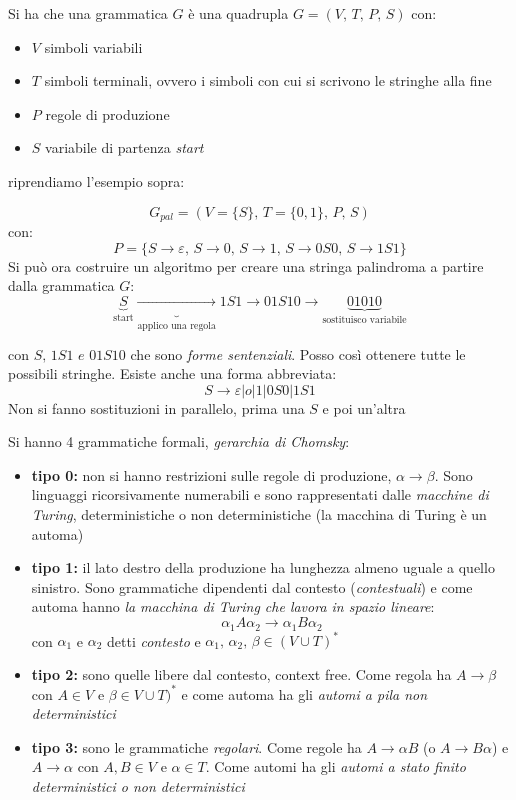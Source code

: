 \documentclass[a4paper,12pt, oneside]{book}
\begin{document}
Si ha che una grammatica $G$ è una quadrupla $G=(V,\,T,\,P,\,S)$ con:
\begin{itemize}
\item $V$ simboli variabili
\item $T$ simboli terminali, ovvero i simboli con cui si scrivono le stringhe alla fine
\item $P$ regole di produzione
\item $S$ variabile di partenza \textit{start}
\end{itemize}
riprendiamo l'esempio sopra:
\begin{esempio}
$$G_{pal}=(V=\{S\},\, T=\{0, 1\},\, P,\, S)$$
con:
$$P=\{S\to\varepsilon,\, S\to 0,\, S\to 1,\, S\to 0S0,\, S\to 1S1\}$$
Si può ora costruire un algoritmo per creare una stringa palindroma a partire dalla grammatica $G$:
$$\underbrace{S}_{\mbox{start}}\underbrace{\to}_{\mbox{applico una regola}} 1S1 \to 01S10\to \underbrace{01010}_{\mbox{sostituisco variabile}}$$

con $S,\, 1S1\,\, e\,\, 01S10$ che sono \textit{forme sentenziali}. Posso così ottenere tutte le possibili stringhe. Esiste anche una forma abbreviata:
$$S\to \varepsilon|o|1|0S0|1S1$$
Non si fanno sostituzioni in parallelo, prima una $S$ e poi un'altra
\end{esempio}
Si hanno 4 grammatiche formali, \textit{gerarchia di Chomsky}:
\begin{itemize}
\item \textbf{tipo 0:} non si hanno restrizioni sulle regole di produzione, $\alpha\to\beta$. Sono linguaggi ricorsivamente numerabili e sono rappresentati dalle \textit{macchine di Turing}, deterministiche o non deterministiche (la macchina di Turing è un automa)
\item \textbf{tipo 1:}  il lato destro della produzione ha lunghezza almeno uguale a quello sinistro. Sono grammatiche dipendenti dal contesto (\textit{contestuali}) e come automa hanno\textit{ la macchina di Turing che lavora in spazio lineare}:
$$\alpha_1A\alpha_2\to \alpha_1B\alpha_2$$
con $\alpha_1$ e $\alpha_2$ detti \textit{contesto} e $\alpha_1,\,\alpha_2,\, \beta\in (V\cup T)^*$
\item \textbf{tipo 2:} sono quelle libere dal contesto, context free. Come regola ha $A\to\beta$ con $A\in V$ e $\beta\in V\cup T)^*$ e come automa ha gli \textit{automi a pila non deterministici}
\item \textbf{tipo 3:} sono le grammatiche \textit{regolari}. Come regole ha $A\to\alpha B$ (o $A\to B\alpha$) e $A\to\alpha$  con $A,B\in V$ e $\alpha\in T$. Come automi ha gli \textit{automi a stato finito deterministici o non deterministici}
\end{itemize}
\end{document}
